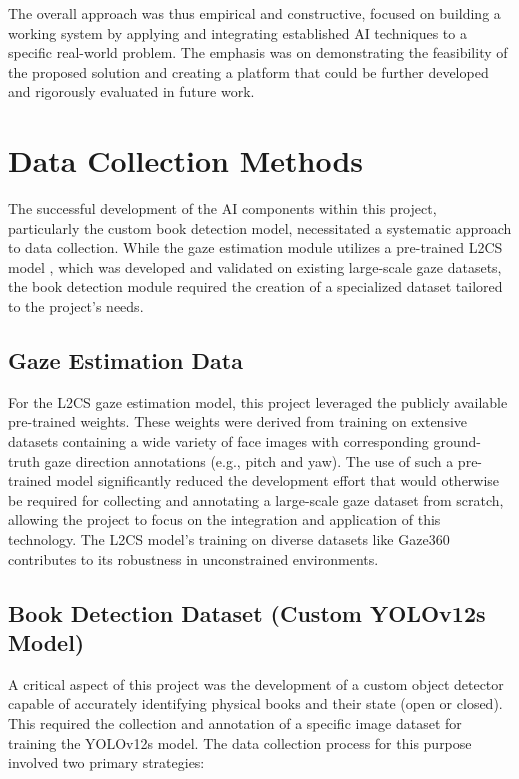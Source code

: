 The overall approach was thus empirical and constructive, focused on building a working system by applying and integrating established AI techniques to a specific real-world problem. The emphasis was on demonstrating the feasibility of the proposed solution and creating a platform that could be further developed and rigorously evaluated in future work.

\section{Data Collection Methods}
The successful development of the AI components within this project, particularly the custom book detection model, necessitated a systematic approach to data collection. While the gaze estimation module utilizes a pre-trained L2CS model \cite{L2CSNet2022}, which was developed and validated on existing large-scale gaze datasets, the book detection module required the creation of a specialized dataset tailored to the project's needs.

\subsection{Gaze Estimation Data}
For the L2CS gaze estimation model, this project leveraged the publicly available pre-trained weights. These weights were derived from training on extensive datasets containing a wide variety of face images with corresponding ground-truth gaze direction annotations (e.g., pitch and yaw). The use of such a pre-trained model significantly reduced the development effort that would otherwise be required for collecting and annotating a large-scale gaze dataset from scratch, allowing the project to focus on the integration and application of this technology. The L2CS model's training on diverse datasets like Gaze360 contributes to its robustness in unconstrained environments.

\subsection{Book Detection Dataset (Custom YOLOv12s Model)}
A critical aspect of this project was the development of a custom object detector capable of accurately identifying physical books and their state (open or closed). This required the collection and annotation of a specific image dataset for training the YOLOv12s model. The data collection process for this purpose involved two primary strategies:

